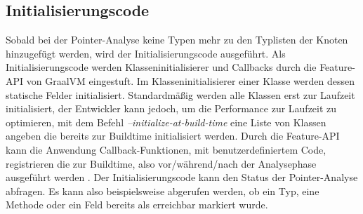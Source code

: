 \subsection{Initialisierungscode}
\label{subsec:initializationcode}
Sobald bei der Pointer-Analyse keine Typen mehr zu den Typlisten der Knoten hinzugefügt werden, wird der Initialisierungscode ausgeführt. Als Initialisierungscode werden Klasseninitialisierer und Callbacks durch die Feature-API von GraalVM eingestuft.
Im Klasseninitialisierer einer Klasse werden dessen statische Felder initialisiert. Standardmäßig werden alle Klassen erst zur Laufzeit initialisiert, der Entwickler kann jedoch, um die Performance zur Laufzeit zu optimieren, mit dem Befehl \textit{--initialize-at-build-time} eine Liste von Klassen angeben die bereits zur Buildtime initialisiert werden\parencite[Ab Version 19.0]{Wimmer2019Medium}.
Durch die Feature-API kann die Anwendung Callback-Funktionen, mit benutzerdefiniertem Code, registrieren die zur Buildtime, also vor/während/nach der Analysephase ausgeführt werden \parencite{GraalVM}. Der Initialisierungscode kann den Status der Pointer-Analyse abfragen. Es kann also beispielsweise abgerufen werden, ob ein Typ, eine Methode oder ein Feld bereits als \glqq erreichbar\grqq{} markiert wurde.
